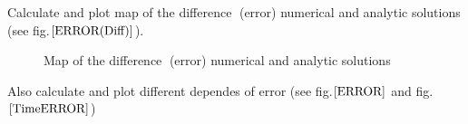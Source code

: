 Calculate and plot map of the difference (error)  numerical and analytic solutions (see fig.$\ref{ERROR(Diff)}$).

\begin{figure}[h]\label{ERROR(Diff)}
\caption{Map of the difference (error)  numerical and analytic solutions}
\end{figure}

Also calculate and plot different dependes of error (see fig.$\ref{ERROR}$ and fig.$\ref{TimeERROR}$)

